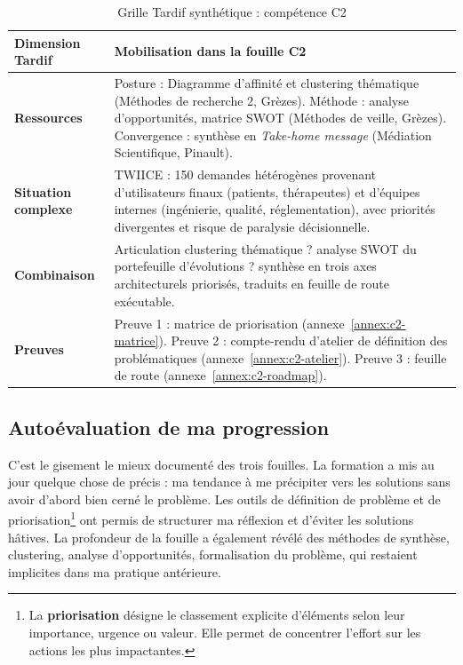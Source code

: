 \begin{table}[h!]
  \centering\small
  \caption{Grille Tardif synthétique : compétence C2}
  \label{tab:grille-tardif-c2}
  \begin{tabularx}{\textwidth}{@{} >{\bfseries}p{3.2cm} X @{}}
    \toprule
    Dimension Tardif & Mobilisation dans la fouille C2 \\
    \midrule
    Ressources & Posture : Diagramme d'affinité et clustering thématique (Méthodes de recherche 2, Grèzes). Méthode : analyse d'opportunités, matrice SWOT (Méthodes de veille, Grèzes). Convergence : synthèse en \emph{Take-home message} (Médiation Scientifique, Pinault). \\
    \midrule
    Situation complexe & TWIICE : 150 demandes hétérogènes provenant d'utilisateurs finaux (patients, thérapeutes) et d'équipes internes (ingénierie, qualité, réglementation), avec priorités divergentes et risque de paralysie décisionnelle. \\
    \midrule
    Combinaison & Articulation clustering thématique ? analyse SWOT du portefeuille d'évolutions ? synthèse en trois axes architecturels priorisés, traduits en feuille de route exécutable. \\
    \midrule
    Preuves & Preuve 1 : matrice de priorisation (annexe~\ref{annex:c2-matrice}). Preuve 2 : compte-rendu d'atelier de définition des problématiques (annexe~\ref{annex:c2-atelier}). Preuve 3 : feuille de route (annexe~\ref{annex:c2-roadmap}). \\
    \bottomrule
  \end{tabularx}
\end{table}

\bigskip

\subsection{Autoévaluation de ma progression}

C'est le gisement le mieux documenté des trois fouilles. La formation a mis au jour quelque chose de précis : ma tendance à me précipiter vers les solutions sans avoir d'abord bien cerné le problème. Les outils de définition de problème et de priorisation\footnote{La \textbf{priorisation} désigne le classement explicite d'éléments selon leur importance, urgence ou valeur. Elle permet de concentrer l'effort sur les actions les plus impactantes.} ont permis de structurer ma réflexion et d'éviter les solutions hâtives. La profondeur de la fouille a également révélé des méthodes de synthèse, clustering, analyse d'opportunités, formalisation du problème, qui restaient implicites dans ma pratique antérieure.

